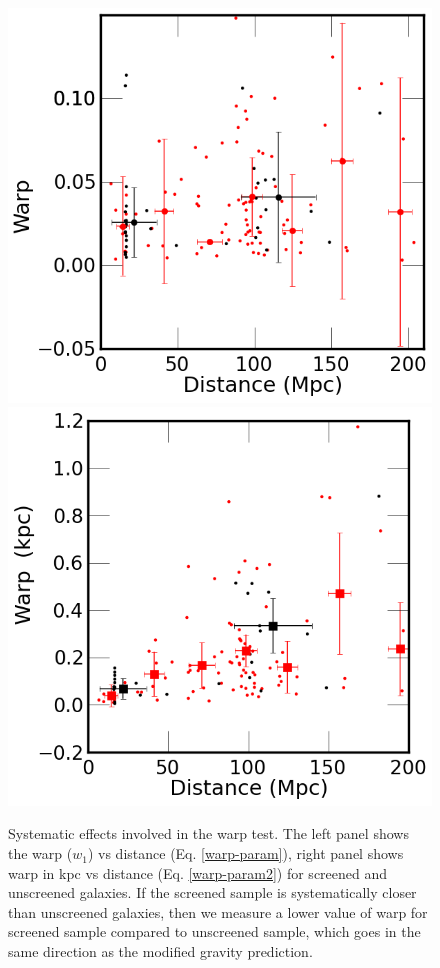 \documentclass[twocolappendix, numberedappendix]{emulateapj}
\begin{document}
\begin{figure}
\begin{center}
  \includegraphics[scale=0.37]{figures/distance-vs-warpness.png}
  \includegraphics[scale=0.37]{figures/distance-vs-warp-kpc.png}
  \caption{Systematic effects involved in the warp test. The left panel shows the
warp ($w_1$) vs distance (Eq. \ref{warp-param}), right panel shows
warp in kpc vs  distance (Eq. \ref{warp-param2}) for screened and
unscreened galaxies. If the screened sample is systematically
closer than unscreened galaxies, then we measure a lower value of warp for
screened sample compared to unscreened sample, which goes in the same direction
as the modified gravity prediction.}
\label{warp-syst}
\end{center}
\end{figure}
\end{document}
